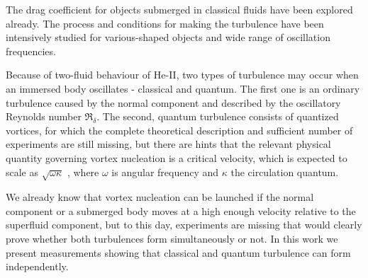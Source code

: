 The drag coefficient for objects submerged in classical fluids have been explored already. The process and conditions for making the turbulence have been intensively studied for various-shaped objects and wide range of oscillation frequencies.

Because of two-fluid behaviour of He-II, two types of turbulence may occur when an immersed body oscillates - classical and quantum. The first one is an ordinary turbulence caused by the normal component and described by the oscillatory Reynolds number $ \Re_{\delta} $.
The second, quantum turbulence consists of quantized vortices, for which the complete theoretical description and sufficient number of experiments are still missing, but there are hints that the relevant physical quantity governing vortex nucleation is a critical velocity, which is expected to scale as $\sqrt{\omega \kappa}$ \cite{schoepe}, where $\omega$ is angular frequency and $\kappa$ the circulation quantum.

We already know that vortex nucleation can be launched if the normal component or a submerged body moves at a high enough velocity relative to the superfluid component, but to this day, experiments are missing that would clearly prove whether both turbulences form simultaneously or not. In this work we present measurements showing that classical and quantum turbulence can form independently.
